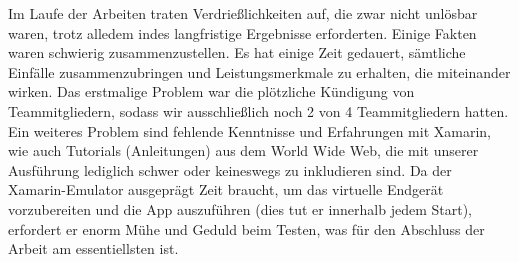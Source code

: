 Im Laufe der Arbeiten traten Verdrießlichkeiten auf, die zwar nicht 
unlösbar waren, trotz alledem indes langfristige Ergebnisse erforderten. 
Einige Fakten waren schwierig zusammenzustellen. Es hat einige Zeit 
gedauert, sämtliche Einfälle zusammenzubringen und Leistungsmerkmale 
zu erhalten, die miteinander wirken. Das erstmalige Problem war die 
plötzliche Kündigung von Teammitgliedern, sodass wir ausschließlich 
noch 2 von 4 Teammitgliedern hatten. Ein weiteres Problem sind fehlende 
Kenntnisse und Erfahrungen mit Xamarin, wie auch Tutorials 
(Anleitungen) aus dem World Wide Web, die mit unserer Ausführung 
lediglich schwer oder keineswegs zu inkludieren sind. Da der 
Xamarin-Emulator ausgeprägt Zeit braucht, um das virtuelle Endgerät 
vorzubereiten und die App auszuführen (dies tut er innerhalb jedem Start),
erfordert er enorm Mühe und Geduld beim Testen, was für den Abschluss 
der Arbeit am essentiellsten ist.